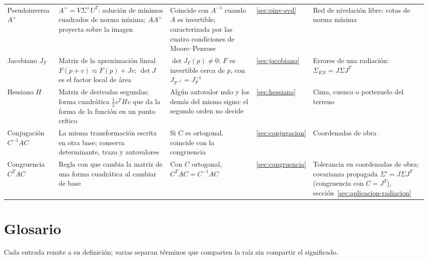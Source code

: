 \begin{table}[p]
\begin{tabularx}{\textwidth}{@{}>{\raggedright\arraybackslash}p{23mm}YY>{\centering\arraybackslash}p{10mm}>{\raggedright\arraybackslash}p{31mm}@{}}
Pseudoinversa \(A^{+}\) & \(A^{+}=V\Sigma^{+}U^T\): solución de mínimos cuadrados de norma mínima; \(AA^{+}\) proyecta sobre la imagen & Coincide con \(A^{-1}\) cuando \(A\) es invertible; caracterizada por las cuatro condiciones de Moore--Penrose & \ref{sec:pinv-svd} & Red de nivelación libre: cotas de norma mínima\\
Jacobiano \(J_F\) & Matriz de la aproximación lineal \(F(p+v)\approx F(p)+Jv\); \(\det J\) es el factor local de área & \(\det J_F(p)\neq0\): \(F\) es invertible cerca de \(p\), con \(J_{F^{-1}}=J_F^{-1}\) & \ref{sec:jacobiano} & Errores de una radiación: \(\Sigma_{EN}=J\Sigma J^T\)\\
Hessiano \(H\) & Matriz de derivadas segundas; forma cuadrática \(\tfrac12v^THv\) que da la forma de la función en un punto crítico & Algún autovalor nulo y los demás del mismo signo: el segundo orden no decide & \ref{sec:hessiana} & Cima, cuenca o portezuelo del terreno\\
Conjugación \(C^{-1}AC\) & La misma transformación escrita en otra base; conserva determinante, traza y autovalores & Si \(C\) es ortogonal, coincide con la congruencia & \ref{sec:conjugacion} & Coordenadas de obra\\
Congruencia \(C^TAC\) & Regla con que cambia la matriz de una forma cuadrática al cambiar de base & Con \(C\) ortogonal, \(C^TAC=C^{-1}AC\) & \ref{sec:congruencia} & Tolerancia en coordenadas de obra; covarianza propagada \(\Sigma'=J\Sigma J^T\) (congruencia con \(C=J^T\)), sección~\ref{sec:aplicacion-radiacion}\\
\bottomrule
\end{tabularx}
\end{table}

\section{Glosario}\label{sec:glosario}

Cada entrada remite a su definición; varias separan términos que comparten la raíz sin
compartir el significado.

